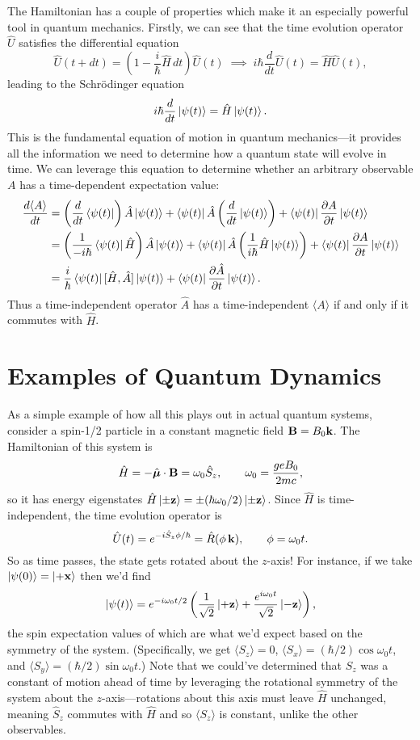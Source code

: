 \documentclass[../p116main.tex]{subfiles}
\begin{document}
The Hamiltonian has a couple of properties which make it an especially powerful tool in quantum mechanics.
Firstly, we can see that the time evolution operator $\hat U$ satisfies the differential equation
\[ \hat U(t + dt) = \left( 1 - \frac{i}{\hbar} \hat H \,dt \right) \hat U(t) \;\implies\; i\hbar \frac{d}{dt} \hat U(t) = \hat H \hat U(t), \]
leading to the Schrödinger equation
\[ i\hbar \frac{d}{dt} \left| \psi(t) \right> = \hat H \left| \psi(t) \right>. \]
This is the fundamental equation of motion in quantum mechanics---it provides all the information we need to determine how a quantum state will evolve in time.
We can leverage this equation to determine whether an arbitrary observable $A$ has a time-dependent expectation value:
\begin{align*}
    \frac{d \langle A \rangle}{dt} &= \left( \frac{d}{dt} \left< \psi(t) \right| \right) \hat A \left| \psi(t) \right> + \left< \psi(t) \right| \hat A \left( \frac{d}{dt} \left| \psi(t) \right> \right) + \left< \psi(t) \right| \frac{\partial A}{\partial t} \left| \psi(t) \right> \\
    &= \left( \frac{1}{-i\hbar} \left< \psi(t) \right| \hat H \right) \hat A \left| \psi(t) \right> + \left< \psi(t) \right| \hat A \left( \frac{1}{i\hbar} \hat H \left| \psi(t) \right> \right) + \left< \psi(t) \right| \frac{\partial A}{\partial t} \left| \psi(t) \right> \\
    &= \frac{i}{\hbar} \left< \psi(t) \right| [\hat H, \hat A] \left| \psi(t) \right> + \left< \psi(t) \right| \frac{\partial \hat A}{\partial t} \left| \psi(t) \right>.
\end{align*}
Thus a time-independent operator $\hat A$ has a time-independent $\langle A \rangle$ if and only if it commutes with $\hat H$.

\section{Examples of Quantum Dynamics}
As a simple example of how all this plays out in actual quantum systems, consider a spin-1/2 particle in a constant magnetic field $\mathbf{B} = B_0 \mathbf{k}$.
The Hamiltonian of this system is
\[ \hat H = -\hat{\bm \mu} \cdot \mathbf{B} = \omega_0 \hat S_z, \qquad \omega_0 = \frac{ge B_0}{2mc}, \]
so it has energy eigenstates $\hat H \left| \pm \mathbf{z} \right> = \pm (\hbar \omega_0 / 2) \left| \pm \mathbf{z} \right>$.
Since $\hat H$ is time-independent, the time evolution operator is
\[ \hat U(t) = e^{-i \hat S_z \phi / \hbar} = \hat R(\phi \,\mathbf{k}), \qquad \phi = \omega_0 t. \]
So as time passes, the state gets rotated about the $z$-axis!
For instance, if we take $\left| \psi(0) \right> = \left| +\mathbf{x} \right>$ then we'd find
\[ \left| \psi(t) \right> = e^{-i \omega_0 t / 2} \left( \frac{1}{\sqrt{2}} \left| +\mathbf{z} \right> + \frac{e^{i \omega_0 t}}{\sqrt{2}} \left| -\mathbf{z} \right> \right), \]
the spin expectation values of which are what we'd expect based on the symmetry of the system.
(Specifically, we get $\langle S_z \rangle = 0$, $\langle S_x \rangle = (\hbar / 2) \cos \omega_0 t$, and $\langle S_y \rangle = (\hbar / 2) \sin \omega_0 t$.)
Note that we could've determined that $S_z$ was a constant of motion ahead of time by leveraging the rotational symmetry of the system about the $z$-axis---rotations about this axis must leave $\hat H$ unchanged, meaning $\hat S_z$ commutes with $\hat H$ and so $\langle S_z \rangle$ is constant, unlike the other observables.
\end{document}
